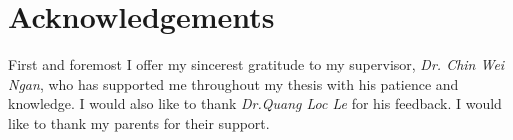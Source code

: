 \section{Acknowledgements}
First and foremost I offer my sincerest gratitude to my supervisor, \textit{Dr. Chin Wei Ngan}, who has supported me throughout my thesis with his patience and knowledge. I would also like to thank \textit{Dr.Quang Loc Le} for his feedback. I would like to thank my parents for their support.

\newpage